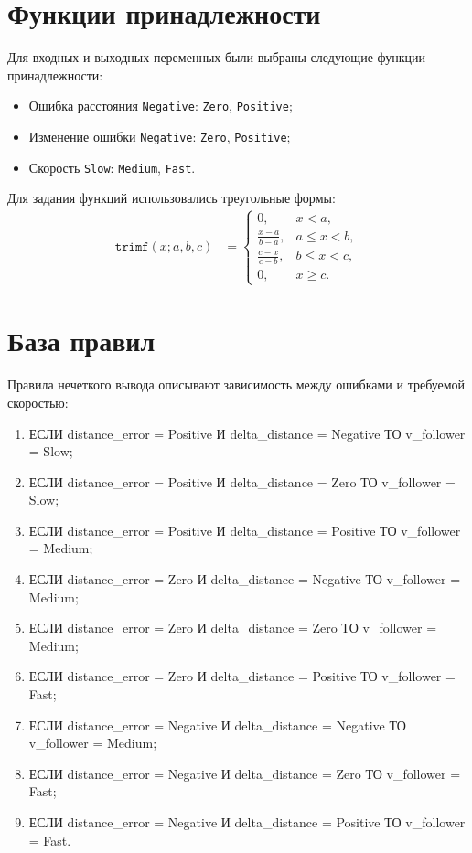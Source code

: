 \section{Функции принадлежности}

Для входных и выходных переменных были выбраны следующие функции принадлежности:

\begin{itemize}
    \item Ошибка расстояния \texttt{Negative}: \texttt{Zero}, \texttt{Positive};
    \item Изменение ошибки \texttt{Negative}: \texttt{Zero}, \texttt{Positive};
    \item Скорость \texttt{Slow}: \texttt{Medium}, \texttt{Fast}.
\end{itemize}

Для задания функций использовались треугольные формы:
\begin{align*}
\texttt{trimf}(x; a,b,c) &= 
\begin{cases}
0, & x < a,\\
\frac{x-a}{b-a}, & a \le x < b,\\
\frac{c-x}{c-b}, & b \le x < c,\\
0, & x \ge c.
\end{cases}
\end{align*}


\section{База правил}

Правила нечеткого вывода описывают зависимость между ошибками и требуемой скоростью:

\begin{enumerate}
    \item ЕСЛИ distance\_error = Positive И delta\_distance = Negative ТО v\_follower = Slow;
    \item ЕСЛИ distance\_error = Positive И delta\_distance = Zero ТО v\_follower = Slow;
    \item ЕСЛИ distance\_error = Positive И delta\_distance = Positive ТО v\_follower = Medium;
    \item ЕСЛИ distance\_error = Zero И delta\_distance = Negative ТО v\_follower = Medium;
    \item ЕСЛИ distance\_error = Zero И delta\_distance = Zero ТО v\_follower = Medium;
    \item ЕСЛИ distance\_error = Zero И delta\_distance = Positive ТО v\_follower = Fast;
    \item ЕСЛИ distance\_error = Negative И delta\_distance = Negative ТО v\_follower = Medium;
    \item ЕСЛИ distance\_error = Negative И delta\_distance = Zero ТО v\_follower = Fast;
    \item ЕСЛИ distance\_error = Negative И delta\_distance = Positive ТО v\_follower = Fast.
\end{enumerate}

